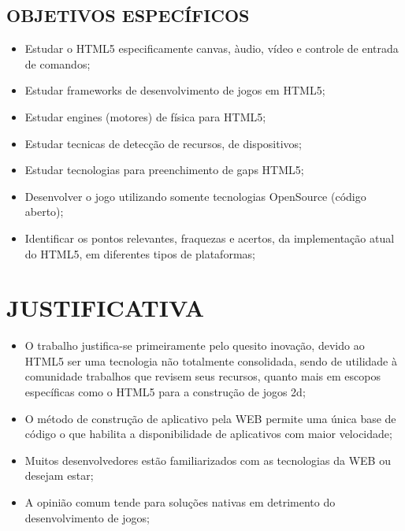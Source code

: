 \documentclass{article}
\begin{document}
\subsection{OBJETIVOS ESPECÍFICOS}


\begin{itemize}
    \item Estudar o HTML5 especificamente canvas, àudio, vídeo e controle de entrada de comandos;
    \item Estudar frameworks de desenvolvimento de jogos em HTML5;

    \item Estudar engines (motores) de física para HTML5;

    \item Estudar tecnicas de detecção de recursos, de dispositivos;

    \item Estudar tecnologias para preenchimento de gaps HTML5;

    \item Desenvolver o jogo utilizando somente tecnologias OpenSource (código aberto);

    \item Identificar os pontos relevantes, fraquezas e acertos, da implementação atual do HTML5, em diferentes tipos de plataformas;


\end{itemize}

\section{JUSTIFICATIVA}


\begin{itemize}

    \item O trabalho justifica-se primeiramente pelo quesito inovação, devido ao HTML5 ser uma tecnologia não totalmente consolidada, sendo de utilidade à comunidade trabalhos que revisem seus recursos, quanto mais em escopos específicas como o HTML5 para a construção de jogos 2d;

    \item O método de construção de aplicativo pela WEB permite uma única base de código o que habilita a disponibilidade de aplicativos com maior velocidade;

    \item Muitos desenvolvedores estão familiarizados com as tecnologias da WEB ou desejam estar;

    \item A opinião comum tende para soluções nativas em detrimento do desenvolvimento de jogos;
    

\end{itemize}
\end{document}
